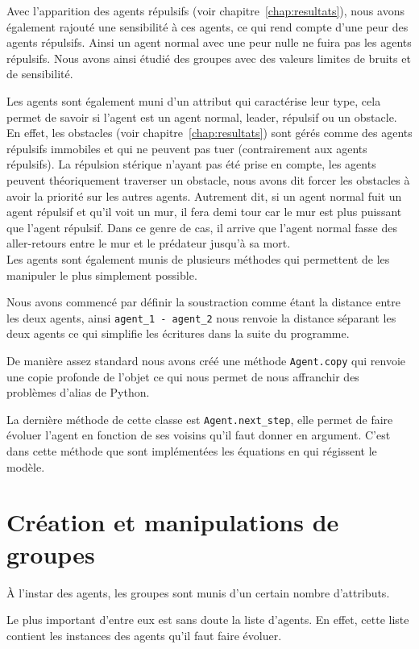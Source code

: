 \documentclass[french, a4paper, 12pt, openany]{report}
\begin{document}
	Avec l'apparition des agents répulsifs (voir chapitre~\ref{chap:resultats}), nous avons également rajouté une sensibilité à ces agents, ce qui rend compte d'une peur des agents répulsifs. Ainsi un agent normal avec une peur nulle ne fuira pas les agents répulsifs. Nous avons ainsi étudié des groupes avec des valeurs limites de bruits et de sensibilité.
	
	Les agents sont également muni d'un attribut qui caractérise leur type, cela permet de savoir si l'agent est un agent normal, leader, répulsif ou un obstacle. En effet, les obstacles (voir chapitre~\ref{chap:resultats}) sont gérés comme des agents répulsifs immobiles et qui ne peuvent pas tuer (contrairement aux agents répulsifs). La répulsion stérique n'ayant pas été prise en compte, les agents peuvent théoriquement traverser un obstacle, nous avons dit forcer les obstacles à avoir la priorité sur les autres agents. Autrement dit, si un agent normal fuit un agent répulsif et qu'il voit un mur, il fera demi tour car le mur est plus puissant que l'agent répulsif. Dans ce genre de cas, il arrive que l'agent normal fasse des aller-retours entre le mur et le prédateur jusqu'à sa mort. \\
	
	Les agents sont également munis de plusieurs méthodes qui permettent de les manipuler le plus simplement possible.
	
	Nous avons commencé par définir la soustraction comme étant la distance entre les deux agents, ainsi \verb|agent_1 - agent_2| nous renvoie la distance séparant les deux agents ce qui simplifie les écritures dans la suite du programme.
	
	De manière assez standard nous avons créé une méthode \verb|Agent.copy| qui renvoie une copie profonde de l'objet ce qui nous permet de nous affranchir des problèmes d'alias de Python.
	
	La dernière méthode de cette classe est \verb|Agent.next_step|, elle permet de faire évoluer l'agent en fonction de ses voisins qu'il faut donner en argument. C'est dans cette méthode que sont implémentées les équations en qui régissent le modèle.
	
\section{Création et manipulations de groupes}
	À l'instar des agents, les groupes sont munis d'un certain nombre d'attributs.
	
	Le plus important d'entre eux est sans doute la liste d'agents. En effet, cette liste contient les instances des agents qu'il faut faire évoluer.
	
\end{document}
